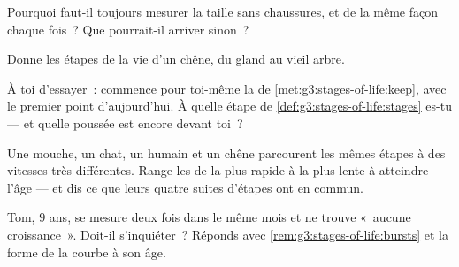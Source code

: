 \begin{exercise}[$\star$]\label{exo:g3:stages-of-life:6}
Pourquoi faut-il toujours mesurer la taille sans chaussures, et de
la même façon chaque fois~? Que pourrait-il arriver sinon~?
\end{exercise}

\begin{exercise}[$\star$]\label{exo:g3:stages-of-life:7}
Donne les étapes de la vie d'un chêne, du gland au vieil arbre.
\end{exercise}

\begin{exercise}[$\star$]\label{exo:g3:stages-of-life:8}
À toi d'essayer~: commence pour toi-même la  de
\cref{met:g3:stages-of-life:keep}, avec le premier point
d'aujourd'hui. À quelle étape de
\cref{def:g3:stages-of-life:stages} es-tu --- et quelle poussée est
encore devant toi~?
\end{exercise}

\begin{exercise}[$\star\star$]\label{exo:g3:stages-of-life:9}
Une mouche, un chat, un humain et un chêne parcourent les mêmes
étapes à des vitesses très différentes. Range-les de la plus rapide
à la plus lente à atteindre l'âge  --- et dis ce que leurs
quatre suites d'étapes ont en commun.
\end{exercise}

\begin{exercise}[$\star\star$]\label{exo:g3:stages-of-life:10}
Tom, $9$ ans, se mesure deux fois dans le même mois et ne trouve
«~aucune croissance~». Doit-il s'inquiéter~? Réponds avec
\cref{rem:g3:stages-of-life:bursts} et la forme de la courbe à son
âge.
\end{exercise}
